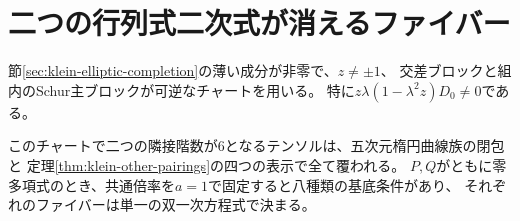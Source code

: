 \section{二つの行列式二次式が消えるファイバー}
\label{sec:klein-zero-quadratics}
節\ref{sec:klein-elliptic-completion}の薄い成分が非零で、$z\ne\pm1$、
交差ブロックと組内のSchur主ブロックが可逆なチャートを用いる。
特に$z\lambda(1-\lambda^2z)D_0\ne0$である。

\begin{theorem}\label{thm:klein-all-pairings}
このチャートで二つの隣接階数が6となるテンソルは、五次元楕円曲線族の閉包と
定理\ref{thm:klein-other-pairings}の四つの表示で全て覆われる。
$P,Q$がともに零多項式のとき、共通倍率を$a=1$で固定すると八種類の基底条件があり、
それぞれのファイバーは単一の双一次方程式で決まる。
\end{theorem}
